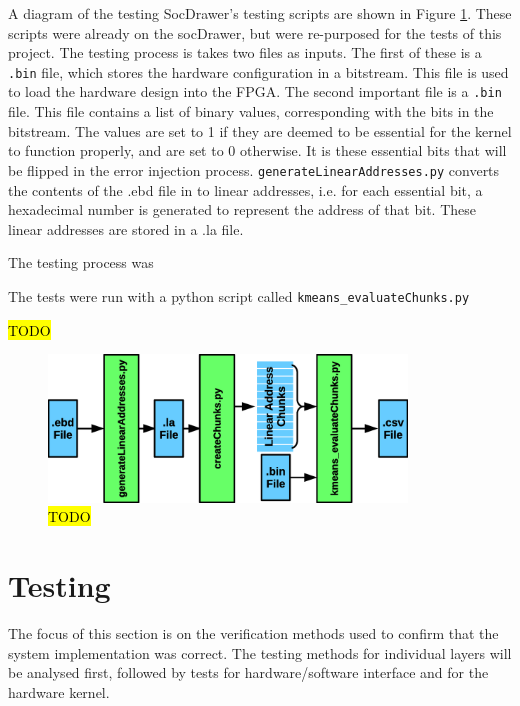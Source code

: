 \documentclass[12pt]{article}
\begin{document}
A diagram of the testing SocDrawer's testing scripts are shown in Figure \ref{fig:testflow}. These scripts were already on the socDrawer, but were re-purposed for the tests of this project. The testing process is takes two files as inputs. The first of these is a \lstinline|.bin| file, which stores the hardware configuration in a bitstream. This file is used to load the hardware design into the FPGA. The second important file is a \lstinline|.bin| file. This file contains a list of binary values, corresponding with the bits in the bitstream. The values are set to 1 if they are deemed to be essential for the kernel to function properly, and are set to 0 otherwise. It is these essential bits that will be flipped in the error injection process. \lstinline|generateLinearAddresses.py| converts the contents of the .ebd file in to linear addresses, i.e. for each essential bit, a hexadecimal number is generated to represent the address of that bit. These linear addresses are stored in a .la file.

The testing process was 

The tests were run with a python script called \lstinline|kmeans_evaluateChunks.py|

\hl{TODO}

\begin{figure} [H]
\centering
\includegraphics[width=0.85\textwidth]{figures/testflow.eps}
\caption{\hl{TODO} }
\label{fig:testflow}
\end{figure}



\newpage

\section{Testing}
\label{sec:Test}

The focus of this section is on the verification methods used to confirm that the system implementation was correct. The testing methods for individual layers will be analysed first, followed by tests for hardware/software interface and for the hardware kernel.
\end{document}
